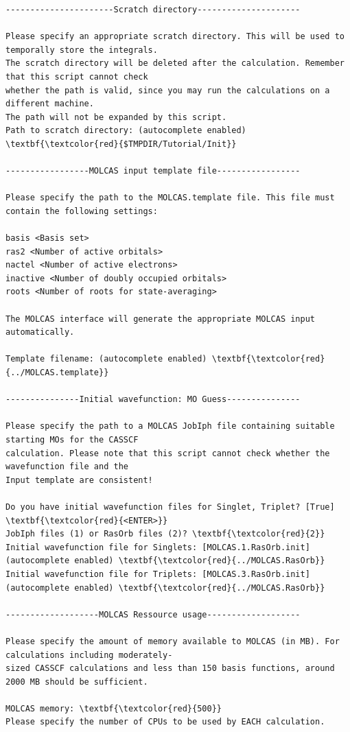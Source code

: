 \documentclass[a4paper,11pt,DIV=15,openany]{scrbook}
\begin{document}
\begin{oframed}
\begin{Verbatim}[commandchars=\\\{\}]
----------------------Scratch directory---------------------

Please specify an appropriate scratch directory. This will be used to temporally store the integrals. 
The scratch directory will be deleted after the calculation. Remember that this script cannot check 
whether the path is valid, since you may run the calculations on a different machine. 
The path will not be expanded by this script.
Path to scratch directory: (autocomplete enabled) \textbf{\textcolor{red}{$TMPDIR/Tutorial/Init}}

-----------------MOLCAS input template file-----------------

Please specify the path to the MOLCAS.template file. This file must contain the following settings:

basis <Basis set>
ras2 <Number of active orbitals>
nactel <Number of active electrons>
inactive <Number of doubly occupied orbitals>
roots <Number of roots for state-averaging>

The MOLCAS interface will generate the appropriate MOLCAS input automatically.

Template filename: (autocomplete enabled) \textbf{\textcolor{red}{../MOLCAS.template}}

---------------Initial wavefunction: MO Guess---------------

Please specify the path to a MOLCAS JobIph file containing suitable starting MOs for the CASSCF 
calculation. Please note that this script cannot check whether the wavefunction file and the 
Input template are consistent!

Do you have initial wavefunction files for Singlet, Triplet? [True] \textbf{\textcolor{red}{<ENTER>}}
JobIph files (1) or RasOrb files (2)? \textbf{\textcolor{red}{2}}
Initial wavefunction file for Singlets: [MOLCAS.1.RasOrb.init] (autocomplete enabled) \textbf{\textcolor{red}{../MOLCAS.RasOrb}}
Initial wavefunction file for Triplets: [MOLCAS.3.RasOrb.init] (autocomplete enabled) \textbf{\textcolor{red}{../MOLCAS.RasOrb}}

-------------------MOLCAS Ressource usage-------------------

Please specify the amount of memory available to MOLCAS (in MB). For calculations including moderately-
sized CASSCF calculations and less than 150 basis functions, around 2000 MB should be sufficient.

MOLCAS memory: \textbf{\textcolor{red}{500}}
Please specify the number of CPUs to be used by EACH calculation.


\end{Verbatim}
\end{oframed}
\end{document}
